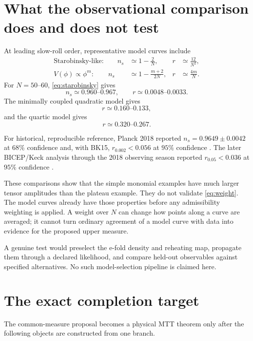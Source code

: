 \documentclass[11pt]{article}
\begin{document}
\section{What the observational comparison does and does not test}

At leading slow-roll order, representative model curves include
\begin{align}
\text{Starobinsky-like:}\qquad
n_s&\simeq1-\frac{2}{N},
&
r&\simeq\frac{12}{N^2},
\label{eq:starobinsky}\\
V(\phi)\propto\phi^m:\qquad
n_s&\simeq1-\frac{m+2}{2N},
&
r&\simeq\frac{4m}{N}.
\label{eq:monomial}
\end{align}
For \(N=50\)--\(60\), \eqref{eq:starobinsky} gives
\[
n_s\simeq0.960\text{--}0.967,\qquad
r\simeq0.0048\text{--}0.0033.
\]
The minimally coupled quadratic model gives
\[
r\simeq0.160\text{--}0.133,
\]
and the quartic model gives
\[
r\simeq0.320\text{--}0.267.
\]

For historical, reproducible reference, Planck 2018 reported
\(n_s=0.9649\pm0.0042\) at \(68\%\) confidence and, with BK15,
\(r_{0.002}<0.056\) at \(95\%\) confidence
\cite{Planck2018}. The later BICEP/Keck analysis through the 2018 observing
season reported \(r_{0.05}<0.036\) at \(95\%\) confidence
\cite{BICEPKeck2021}.

These comparisons show that the simple monomial examples have much larger
tensor amplitudes than the plateau example. They do not validate
\eqref{eq:weight}. The model curves already have those properties before any
admissibility weighting is applied. A weight over \(N\) can change how points
along a curve are averaged; it cannot turn ordinary agreement of a model curve
with data into evidence for the proposed upper measure.

A genuine test would preselect the e-fold density and reheating map, propagate
them through a declared likelihood, and compare held-out observables against
specified alternatives. No such model-selection pipeline is claimed here.

\section{The exact completion target}

The common-measure proposal becomes a physical MTT theorem only after the
following objects are constructed from one branch.
\end{document}

